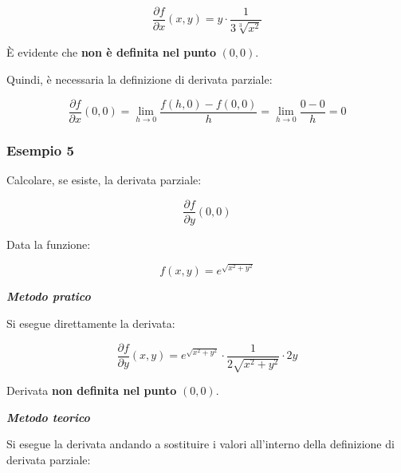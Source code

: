 \documentclass[a4paper]{article}
\begin{document}
	\begin{equation*}
		\dfrac{\partial f}{\partial x}\left(x,y\right) = y \cdot \dfrac{1}{3 \sqrt[3]{x^{2}}}
	\end{equation*}

	\noindent
	È evidente che \textbf{non è definita nel punto} $\left(0,0\right)$.\newline
	
	\noindent
	Quindi, è necessaria la definizione di derivata parziale:
	
	\begin{equation*}
		\dfrac{\partial f}{\partial x}\left(0,0\right) = \lim_{h \rightarrow 0} \dfrac{f\left(h,0\right) - f\left(0,0\right)}{h} = \lim_{h \rightarrow 0} \dfrac{0-0}{h} = 0
	\end{equation*}

	\subsubsection[Esempio 5]{\textcolor{Green4}{Esempio 5}}
	
	Calcolare, se esiste, la derivata parziale:
	
	\begin{equation*}
		\dfrac{\partial f}{\partial y}\left(0,0\right)
	\end{equation*}

	\noindent
	Data la funzione:
	
	\begin{equation*}
		f\left(x,y\right) = e^{\sqrt{x^{2} + y^{2}}}
	\end{equation*}

	\noindent
	\textcolor{Red3}{\textbf{\emph{Metodo pratico}}}\newline
	
	\noindent
	Si esegue direttamente la derivata:
	
	\begin{equation*}
		\dfrac{\partial f}{\partial y}\left(x,y\right) = e^{\sqrt{x^{2} + y^{2}}} \cdot \dfrac{1}{2 \sqrt{x^{2} + y^{2}}} \cdot 2y
	\end{equation*}

	\noindent
	Derivata \textbf{non definita nel punto} $\left(0,0\right)$.\newline
	
	\noindent
	\textcolor{Red3}{\textbf{\emph{Metodo teorico}}}\newline
	
	\noindent
	Si esegue la derivata andando a sostituire i valori all'interno della definizione di derivata parziale:
	
\end{document}
